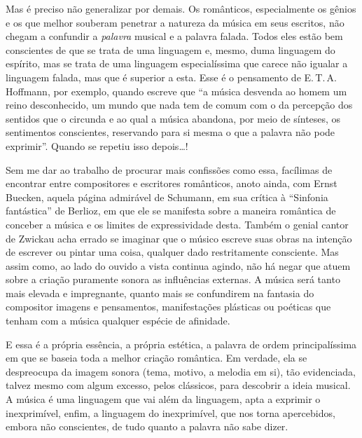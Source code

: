 Mas é preciso não generalizar por demais. Os românticos, especialmente
os gênios e os que melhor souberam penetrar a natureza da música em seus
escritos, não chegam a confundir a \textit{palavra} musical e a palavra
falada. Todos eles estão bem conscientes de que se trata de uma
linguagem e, mesmo, duma linguagem do espírito, mas se trata de uma
linguagem especialíssima que carece não igualar a linguagem falada, mas
que é superior a esta. Esse é o pensamento de E.\,T.\,A.\,Hoffmann, por
exemplo, quando escreve que ``a música desvenda ao homem um reino
desconhecido, um mundo que nada tem de comum com o da percepção dos
sentidos que o circunda e ao qual a música abandona, por meio de
sínteses, os sentimentos conscientes, reservando para si mesma o que a
palavra não pode exprimir''. Quando se repetiu isso depois\ldots{}!

Sem me dar ao trabalho de procurar mais confissões como essa, facílimas
de encontrar entre compositores e escritores românticos, anoto ainda,
com Ernst Buecken, aquela página admirável de Schumann, em sua crítica à
``Sinfonia fantástica'' de Berlioz, em que ele se manifesta sobre a
maneira romântica de conceber a música e os limites de expressividade
desta. Também o genial cantor de Zwickau acha errado se imaginar que o
músico escreve suas obras na intenção de escrever ou pintar uma coisa,
qualquer dado restritamente consciente. Mas assim como, ao lado do
ouvido a vista continua agindo, não há negar que atuem sobre a criação
puramente sonora as influências externas. A música será tanto mais
elevada e impregnante, quanto mais se confundirem na fantasia do
compositor imagens e pensamentos, manifestações plásticas ou poéticas
que tenham com a música qualquer espécie de afinidade.

E essa é a própria essência, a própria estética, a palavra de ordem
principalíssima em que se baseia toda a melhor criação romântica. Em
verdade, ela se despreocupa da imagem sonora (tema, motivo, a melodia
em si), tão evidenciada, talvez mesmo com algum excesso, pelos
clássicos, para descobrir a ideia musical. A música é uma linguagem que
vai além da linguagem, apta a exprimir o inexprimível, enfim, a
linguagem do inexprimível, que nos torna apercebidos, embora não
conscientes, de tudo quanto a palavra não sabe dizer.

